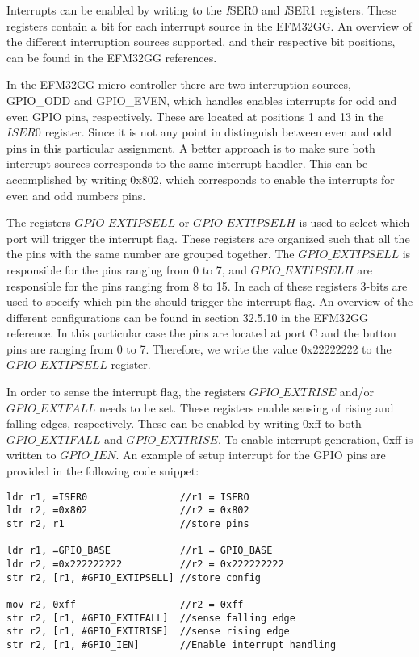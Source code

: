 Interrupts can be enabled by writing to the \emph ISER0 and \emph ISER1 registers. These registers contain a bit for each interrupt source in the EFM32GG. An overview of the different interruption sources supported, and their respective bit positions, can be found in the EFM32GG references\cite[p.12-13]{EFM32GG-rm}. 

In the EFM32GG micro controller there are two interruption sources, GPIO\_ODD and GPIO\_EVEN, which handles enables interrupts for odd and even GPIO pins, respectively. These are located at positions 1 and 13 in the $ISER0$ register. Since it is not any point in distinguish between even and odd pins in this particular assignment. A better approach is to make sure both interrupt sources corresponds to the same interrupt handler. This can be accomplished by writing 0x802, which corresponds to enable the interrupts for even and odd numbers pins.

The registers $GPIO\_EXTIPSELL$ or $GPIO\_EXTIPSELH$ is used to select which port will trigger the interrupt flag. These registers are organized such that all the the pins with the same number are grouped together. The $GPIO\_EXTIPSELL$ is responsible for the pins ranging from 0 to 7, and $GPIO\_EXTIPSELH$ are responsible for the pins ranging from 8 to 15. In each of these registers 3-bits are used to specify which pin the should trigger the interrupt flag. An overview of the different configurations can be found in section 32.5.10 in the EFM32GG reference\cite{EFM32GG-rm}. In this particular case the pins are located at port C and the button pins are ranging from 0 to 7. Therefore, we write the value 0x22222222 to the $GPIO\_EXTIPSELL$ register.

In order to sense the interrupt flag, the registers $GPIO\_EXTRISE$ and/or $GPIO\_EXTFALL$ needs to be set. These registers enable sensing of rising and falling edges, respectively. These can be enabled by writing 0xff to both $GPIO\_EXTIFALL$ and $GPIO\_EXTIRISE$. To enable interrupt generation, 0xff is written to $GPIO\_IEN$. An example of setup interrupt for the GPIO pins are provided in the following code snippet: 

\begin{lstlisting}
ldr r1, =ISER0                //r1 = ISERO
ldr r2, =0x802                //r2 = 0x802  
str r2, r1                    //store pins

ldr r1, =GPIO_BASE            //r1 = GPIO_BASE
ldr r2, =0x222222222          //r2 = 0x222222222
str r2, [r1, #GPIO_EXTIPSELL] //store config

mov r2, 0xff                  //r2 = 0xff 
str r2, [r1, #GPIO_EXTIFALL]  //sense falling edge
str r2, [r1, #GPIO_EXTIRISE]  //sense rising edge
str r2, [r1, #GPIO_IEN]       //Enable interrupt handling 

\end{lstlisting}

